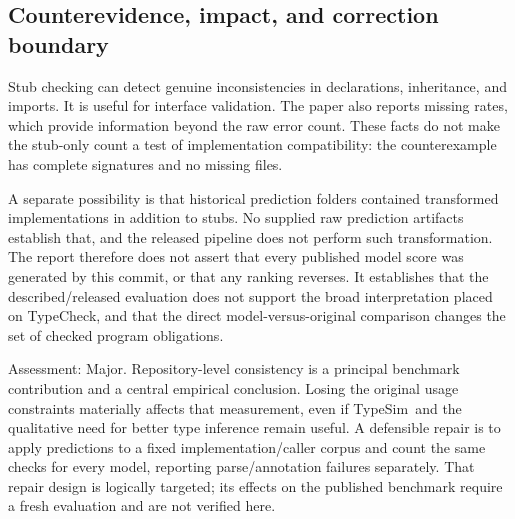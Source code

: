 \documentclass[10pt]{article}
\begin{document}
\subsection*{Counterevidence, impact, and correction boundary}
Stub checking can detect genuine inconsistencies in declarations, inheritance, and imports. It is useful for interface validation. The paper also reports missing rates, which provide information beyond the raw error count. These facts do not make the stub-only count a test of implementation compatibility: the counterexample has complete signatures and no missing files.\par
A separate possibility is that historical prediction folders contained transformed implementations in addition to stubs. No supplied raw prediction artifacts establish that, and the released pipeline does not perform such transformation. The report therefore does not assert that every published model score was generated by this commit, or that any ranking reverses. It establishes that the described/released evaluation does not support the broad interpretation placed on TypeCheck, and that the direct model-versus-original comparison changes the set of checked program obligations.\par
Assessment: Major. Repository-level consistency is a principal benchmark contribution and a central empirical conclusion. Losing the original usage constraints materially affects that measurement, even if TypeSim and the qualitative need for better type inference remain useful. A defensible repair is to apply predictions to a fixed implementation/caller corpus and count the same checks for every model, reporting parse/annotation failures separately. That repair design is logically targeted; its effects on the published benchmark require a fresh evaluation and are not verified here.\par
\end{document}
